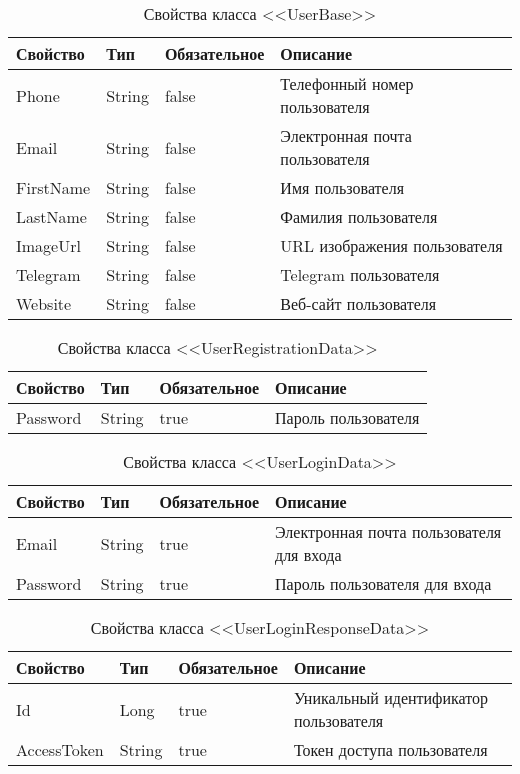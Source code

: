 \begin{xltabular}{\textwidth}{|l|l|p{1.7cm}|X|}
    \caption{Свойства класса <<UserBase>>}\\ \hline
    Свойство & Тип & Обязательное & Описание \\ \hline
    Phone & String & false & Телефонный номер пользователя \\ \hline
    Email & String & false & Электронная почта пользователя \\ \hline
    FirstName & String & false & Имя пользователя \\ \hline
    LastName & String & false & Фамилия пользователя \\ \hline
    ImageUrl & String & false & URL изображения пользователя \\ \hline
    Telegram & String & false & Telegram пользователя \\ \hline
    Website & String & false & Веб-сайт пользователя \\ \hline
\end{xltabular}

\begin{xltabular}{\textwidth}{|l|l|p{1.7cm}|X|}
    \caption{Свойства класса <<UserRegistrationData>>}\\ \hline
    Свойство & Тип & Обязательное & Описание \\ \hline
    Password & String & true & Пароль пользователя \\ \hline
\end{xltabular}

\newpage

\begin{xltabular}{\textwidth}{|l|l|p{1.7cm}|X|}
    \caption{Свойства класса <<UserLoginData>>}\\ \hline
    Свойство & Тип & Обязательное & Описание \\ \hline
    Email & String & true & Электронная почта пользователя для входа \\ \hline
    Password & String & true & Пароль пользователя для входа \\ \hline
\end{xltabular}

\begin{xltabular}{\textwidth}{|l|l|p{1.7cm}|X|}
    \caption{Свойства класса <<UserLoginResponseData>>}\\ \hline
    Свойство & Тип & Обязательное & Описание \\ \hline
    Id & Long & true & Уникальный идентификатор пользователя \\ \hline
    AccessToken & String & true & Токен доступа пользователя \\ \hline
\end{xltabular}

